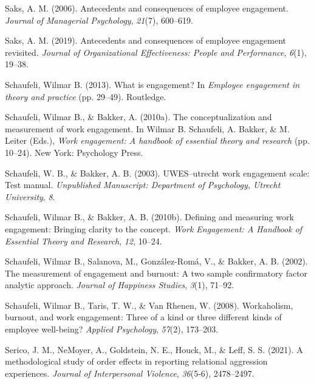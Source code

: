 \documentclass[
  man]{apa6}
\newlength{\cslhangindent}
\newlength{\cslentryspacingunit} %
\newenvironment{CSLReferences}[2] %
 {%
  \setlength{\parindent}{0pt}
  \ifodd #1
  \let\oldpar\par
  \def\par{\hangindent=\cslhangindent\oldpar}
  \fi
  \setlength{\parskip}{#2\cslentryspacingunit}
 }%
 {}
\begin{document}
\begin{CSLReferences}{1}{0}
\leavevmode{}%
Saks, A. M. (2006). Antecedents and consequences of employee engagement. \emph{Journal of Managerial Psychology}, \emph{21}(7), 600--619.

\leavevmode{}%
Saks, A. M. (2019). Antecedents and consequences of employee engagement revisited. \emph{Journal of Organizational Effectiveness: People and Performance}, \emph{6}(1), 19--38.

\leavevmode{}%
Schaufeli, Wilmar B. (2013). What is engagement? In \emph{Employee engagement in theory and practice} (pp. 29--49). Routledge.

\leavevmode{}%
Schaufeli, Wilmar B., \& Bakker, A. (2010a). The conceptualization and measurement of work engagement. In Wilmar B. Schaufeli, A. Bakker, \& M. Leiter (Eds.), \emph{Work engagement: A handbook of essential theory and research} (pp. 10--24). New York: Psychology Press.

\leavevmode{}%
Schaufeli, W. B., \& Bakker, A. B. (2003). {UWES}--utrecht work engagement scale: Test manual. \emph{Unpublished Manuscript: Department of Psychology, Utrecht University}, \emph{8}.

\leavevmode{}%
Schaufeli, Wilmar B., \& Bakker, A. B. (2010b). Defining and measuring work engagement: Bringing clarity to the concept. \emph{Work Engagement: A Handbook of Essential Theory and Research}, \emph{12}, 10--24.

\leavevmode{}%
Schaufeli, Wilmar B., Salanova, M., González-Romá, V., \& Bakker, A. B. (2002). The measurement of engagement and burnout: A two sample confirmatory factor analytic approach. \emph{Journal of Happiness Studies}, \emph{3}(1), 71--92.

\leavevmode{}%
Schaufeli, Wilmar B., Taris, T. W., \& Van Rhenen, W. (2008). Workaholism, burnout, and work engagement: Three of a kind or three different kinds of employee well-being? \emph{Applied Psychology}, \emph{57}(2), 173--203.

\leavevmode{}%
Serico, J. M., NeMoyer, A., Goldstein, N. E., Houck, M., \& Leff, S. S. (2021). A methodological study of order effects in reporting relational aggression experiences. \emph{Journal of Interpersonal Violence}, \emph{36}(5-6), 2478--2497.


\end{CSLReferences}
\end{document}

